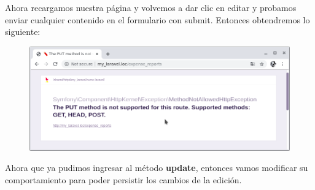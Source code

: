 \documentclass{article}
\begin{document}
Ahora recargamos nuestra página y volvemos a dar clic en editar y probamos
enviar cualquier contenido en el formulario con submit. Entonces obtendremos lo
siguiente:

\begin{figure}[h!]
  \centering
  \includegraphics[scale=0.5]{./Pictures/073_error_put.png}
\end{figure}

Ahora que ya pudimos ingresar al método \textbf{update}, entonces vamos
modificar su comportamiento para poder persistir los cambios de la edición.

\newpage
\end{document}
